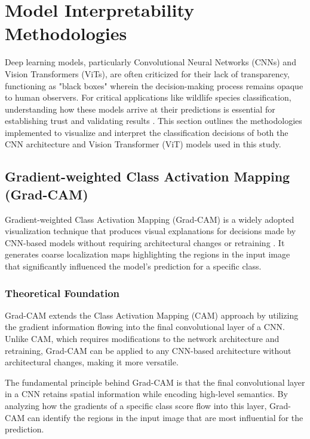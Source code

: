 \documentclass[a4paper,12pt]{report}
\begin{document}
\section{Model Interpretability Methodologies}

Deep learning models, particularly Convolutional Neural Networks (CNNs) and Vision Transformers (ViTs), are often criticized for their lack of transparency, functioning as "black boxes" wherein the decision-making process remains opaque to human observers. For critical applications like wildlife species classification, understanding how these models arrive at their predictions is essential for establishing trust and validating results \citep{Selvaraju_2019}. This section outlines the methodologies implemented to visualize and interpret the classification decisions of both the CNN architecture and Vision Transformer (ViT) models used in this study.

\subsection{Gradient-weighted Class Activation Mapping (Grad-CAM)}

Gradient-weighted Class Activation Mapping (Grad-CAM) is a widely adopted visualization technique that produces visual explanations for decisions made by CNN-based models without requiring architectural changes or retraining \citep{Selvaraju_2019}. It generates coarse localization maps highlighting the regions in the input image that significantly influenced the model's prediction for a specific class.

\subsubsection{Theoretical Foundation}

Grad-CAM extends the Class Activation Mapping (CAM) approach \citep{zhou2015learningdeepfeaturesdiscriminative} by utilizing the gradient information flowing into the final convolutional layer of a CNN. Unlike CAM, which requires modifications to the network architecture and retraining, Grad-CAM can be applied to any CNN-based architecture without architectural changes, making it more versatile.

The fundamental principle behind Grad-CAM is that the final convolutional layer in a CNN retains spatial information while encoding high-level semantics. By analyzing how the gradients of a specific class score flow into this layer, Grad-CAM can identify the regions in the input image that are most influential for the prediction.
\end{document}
